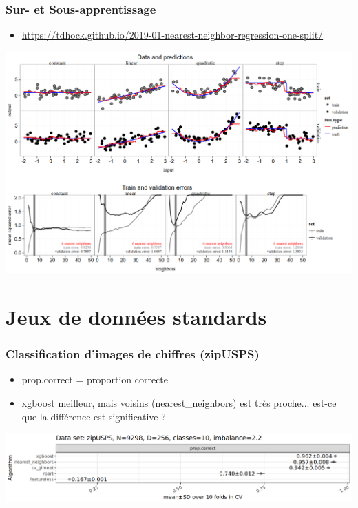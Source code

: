\documentclass{beamer}
\begin{document}
\begin{frame}
  \frametitle{Sur- et Sous-apprentissage}
  \begin{itemize}
  \item \tiny \url{https://tdhock.github.io/2019-01-nearest-neighbor-regression-one-split/}
  \end{itemize}
  \includegraphics[width=\textwidth]{neighbors-4data}
\end{frame}

\section{Jeux de données standards}

\begin{frame}
  \frametitle{Classification d'images de chiffres (zipUSPS)}
  \begin{itemize}
  \item prop.correct = proportion correcte
  \item xgboost meilleur, mais voisins (nearest\_neighbors) est très
    proche... est-ce que la différence est significative ?
  \end{itemize}
  \includegraphics[width=\textwidth]{../cv-evaluation-examples/zipUSPS_error_algos_mean_SD.png}
\end{frame}
\end{document}
